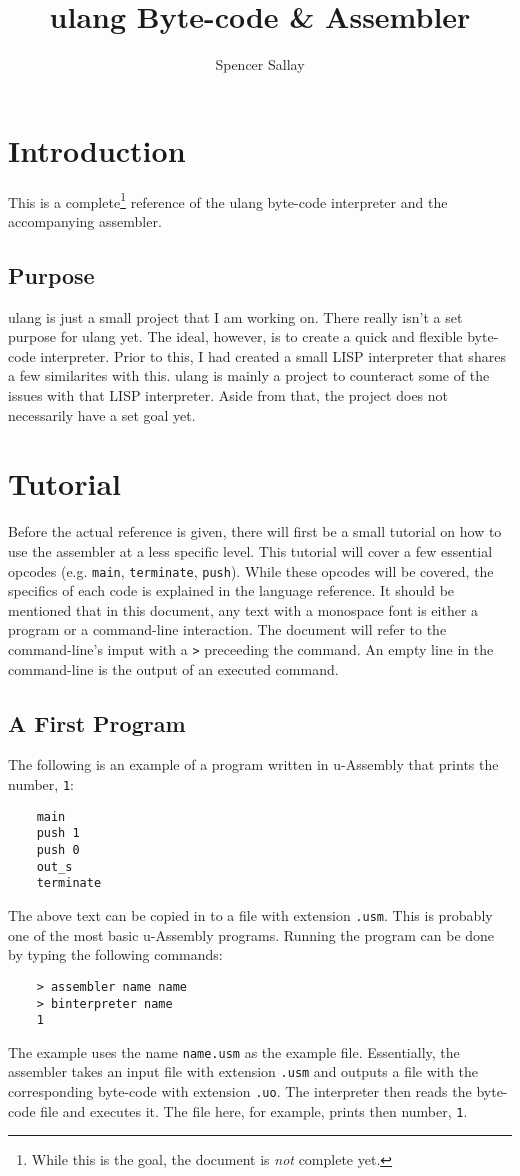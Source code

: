 \documentclass[12pt]{report}
\title{ulang Byte-code \& Assembler}
\author{Spencer Sallay}
\begin{document}
  \maketitle
  \tableofcontents
  \newpage
  \section{Introduction}
  This is a complete\footnote{While this is the goal, the document is \emph{not} 
  complete yet.} reference of the ulang byte-code interpreter and the
  accompanying assembler.
  \subsection{Purpose}
  ulang is just a small project that I am working on.  There really isn't a set purpose
  for ulang yet.  The ideal, however, is to create a quick and flexible byte-code
  interpreter.  Prior to this, I had created a small LISP interpreter that shares a few 
  similarites with this.  ulang is mainly a project to counteract some of the issues with
  that LISP interpreter.  Aside from that, the project does not necessarily have a set
  goal yet.
  \section{Tutorial}
  Before the actual reference is given, there will first be a small tutorial on how to
  use the assembler at a less specific level.  This tutorial will cover a few essential
  opcodes (e.g. \verb|main|, \verb|terminate|, \verb|push|).  While these opcodes
  will be covered, the specifics of each code is explained in the language reference.
  It should be mentioned that in this document, any text with a monospace font is
  either a program or a command-line interaction.  The document will refer to the
  command-line's imput with a \verb|>| preceeding the command.  An empty line
  in the command-line is the output of an executed command.
  \newpage
  \subsection{A First Program}
  The following is an example of a program written in u-Assembly that prints the number,
  \verb|1|: 
  \begin{verbatim}
	main
	push 1
	push 0
	out_s
	terminate
  \end{verbatim}
  The above text can be copied in to a file with extension \verb|.usm|.  This is
  probably one of the most basic u-Assembly programs.  Running the program can be done
  by typing the following commands:
  \begin{verbatim}
	> assembler name name
	> binterpreter name
	1
  \end{verbatim}
  The example uses the name \verb|name.usm| as the example file.  Essentially, the
  assembler takes an input file with extension \verb|.usm| and outputs a file with the
  corresponding byte-code with extension \verb|.uo|.  The interpreter then reads the
  byte-code file and executes it.  The file here, for example, prints then number, 
  \verb|1|.
  
\end{document}
